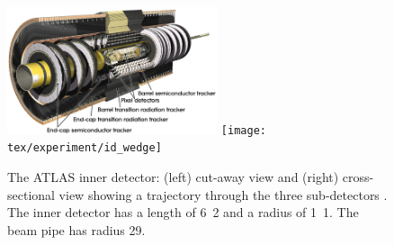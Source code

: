 \begin{figure}
	\includegraphics[width=0.55\textwidth]{tex/experiment/id_whole}
	\hfill
	\texttt{[image: tex/experiment/id\_wedge]}
	\caption{The ATLAS inner detector: (left) cut-away view and (right) cross-sectional 
	view showing a trajectory through the three sub-detectors \cite{ATLAS-detector}. The 
	inner detector has a length of \unit{6.2}{\metre} and a radius of \unit{1.1}{\metre}. 
	The beam pipe has radius \unit{29}{\milli\metre}.}
	\label{fig:inner_detector}
\end{figure}

